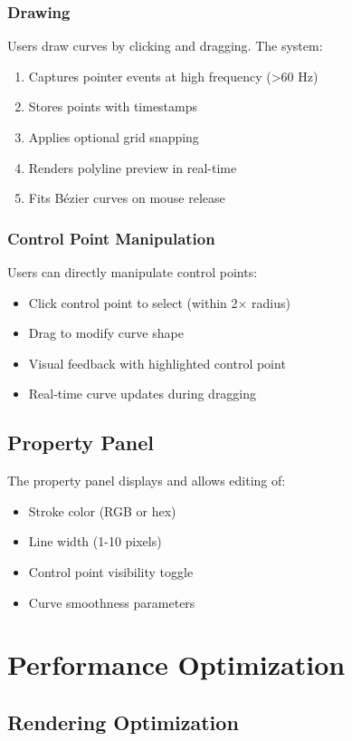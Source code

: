 \documentclass[12pt,a4paper]{article}
\begin{document}
\subsubsection{Drawing}
Users draw curves by clicking and dragging. The system:
\begin{enumerate}
    \item Captures pointer events at high frequency (>60 Hz)
    \item Stores points with timestamps
    \item Applies optional grid snapping
    \item Renders polyline preview in real-time
    \item Fits Bézier curves on mouse release
\end{enumerate}

\subsubsection{Control Point Manipulation}
Users can directly manipulate control points:
\begin{itemize}
    \item Click control point to select (within 2× radius)
    \item Drag to modify curve shape
    \item Visual feedback with highlighted control point
    \item Real-time curve updates during dragging
\end{itemize}

\subsection{Property Panel}

The property panel displays and allows editing of:
\begin{itemize}
    \item Stroke color (RGB or hex)
    \item Line width (1-10 pixels)
    \item Control point visibility toggle
    \item Curve smoothness parameters
\end{itemize}

\section{Performance Optimization}

\subsection{Rendering Optimization}
\end{document}
